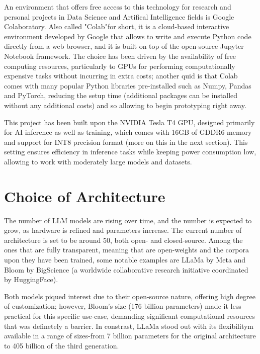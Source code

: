 An environment that offers free access to this technology for research and personal projects in Data Science and Artifical Intelligence fields is Google Colaboratory. \cite{colab2025} Also called "Colab"for short, it is a cloud-based interactive environment developed by Google that allows to write and execute Python code directly from a web browser, and it is built on top of the open-source Jupyter Notebook framework. The choice has been driven by the availability of free computing resources, particularly to GPUs for performing computationally expensive tasks without incurring in extra costs; another quid is that Colab comes with many popular Python libraries pre-installed such as Numpy, Pandas and PyTorch, reducing the setup time (additional packages can be installed without any additional costs) and so allowing to begin prototyping right away.

This project has been built upon the NVIDIA Tesla T4 GPU, designed primarily for AI inference as well as training, which comes with 16GB of GDDR6 memory and support for INT8 precision format (more on this in the next section). This setting ensures efficiency in inference tasks while keeping power consumption low, allowing to work with moderately large models and datasets. \cite{nvidia2025}


\section{Choice of Architecture}
\label{sec:architecture-choice}

The number of LLM models are rising over time, and the number is expected to grow, as hardware is refined and parameters increase. The current number of architecture is set to be around 50, both open- and closed-source. Among the ones that are fully transparent, meaning that are open-weights and the corpora upon they have been trained, some notable examples are LLaMa by Meta \cite{touvron2023llama} and Bloom by BigScience (a worldwide collaborative research initiative coordinated by HuggingFace). \cite{scao2022bloom}

Both models piqued interest due to their open-source nature, offering high degree of customization; however, Bloom's size (176 billion parameters) made it less practical for this specific use-case, demanding significant computational resources that was definetely a barrier. In constrast, LLaMa stood out with its flexibilitym available in a range of sizes-from 7 billion parameters for the original architecture to 405 billion of the third generation.

